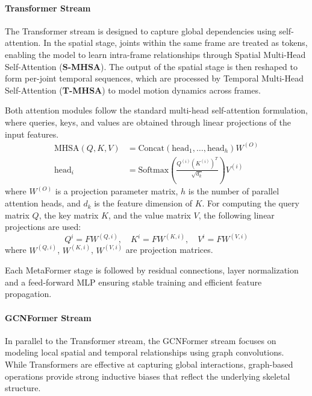 \paragraph{Transformer Stream}
The Transformer stream is designed to capture global dependencies using self-attention.
In the spatial stage, joints within the same frame are treated as tokens, enabling the model to learn intra-frame relationships through Spatial Multi-Head Self-Attention (\textbf{S-MHSA}).
The output of the spatial stage is then reshaped to form per-joint temporal sequences, which are processed by Temporal Multi-Head Self-Attention (\textbf{T-MHSA}) to model motion dynamics across frames.

Both attention modules follow the standard multi-head self-attention formulation, where queries, keys, and values are obtained through linear projections of the input features.
\begin{equation}
    \begin{split}
        \text{MHSA}(Q,K,V) &= \text{Concat}(\text{head}_1,\dots,\text{head}_h)W^{(O)} \\
        \text{head}_i &= \text{Softmax}\left( \frac{Q^{(i)}(K^{(i)})^T}{\sqrt{d_k}} \right) V^{(i)}
    \end{split}
\end{equation} 
where $W^{(O)}$ is a projection parameter matrix, $h$ is the number of parallel attention heads, and $d_k$ is the feature dimension of $K$. For computing the query 
matrix $Q$, the key matrix $K$, and the value matrix $V$, the following linear projections are used: 
\begin{equation} 
    Q ^ i = F W^{(Q,i)}, \quad K ^ i = F W^{(K,i)}, \quad V^i = F W^{(V,i)} 
\end{equation} 
where $W^{(Q,i)}$, $W^{(K,i)}$, $W^{(V,i)}$ are projection matrices.

Each MetaFormer stage is followed by residual connections, layer normalization and a feed-forward MLP ensuring stable training and efficient feature propagation.


\paragraph{GCNFormer Stream}
In parallel to the Transformer stream, the GCNFormer stream focuses on modeling local spatial and temporal relationships using graph convolutions.
While Transformers are effective at capturing global interactions, graph-based operations provide strong inductive biases that reflect the underlying skeletal structure.


